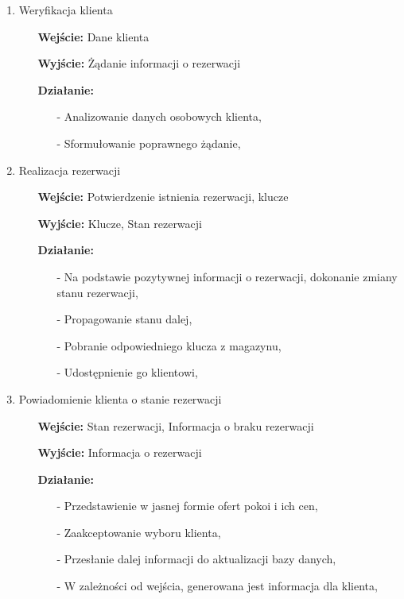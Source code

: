 \documentclass[a4paper, 11pt]{article}
\begin{document}
\begin{enumerate}[label*=\arabic*.]
\begin{enumerate}[label*=\arabic*.]
\begin{enumerate}[label*=\arabic*.]
				\item Weryfikacja klienta
				\begin{itemize}
					\item[\textbf{Wejście:}] Dane klienta
					\item[\textbf{Wyjście:}] Żądanie informacji o rezerwacji
					\item[\textbf{Działanie:}] 
					\begin{itemize}
						\item[-] Analizowanie danych osobowych klienta,
						\item[-] Sformułowanie poprawnego żądanie,
					\end{itemize}														
				\end{itemize}	
				\item Realizacja rezerwacji
				\begin{itemize}
					\item[\textbf{Wejście:}] Potwierdzenie istnienia rezerwacji, klucze
					\item[\textbf{Wyjście:}] Klucze, Stan rezerwacji
					\item[\textbf{Działanie:}] 
					\begin{itemize}
						\item[-] Na podstawie pozytywnej informacji o rezerwacji, dokonanie zmiany stanu rezerwacji,
						\item[-] Propagowanie stanu dalej,
						\item[-] Pobranie odpowiedniego klucza z magazynu,
						\item[-] Udostępnienie go klientowi,
					\end{itemize}														
				\end{itemize}	
				\item Powiadomienie klienta o stanie rezerwacji
				\begin{itemize}
					\item[\textbf{Wejście:}] Stan rezerwacji, Informacja o braku rezerwacji
					\item[\textbf{Wyjście:}] Informacja o rezerwacji
					\item[\textbf{Działanie:}] 
					\begin{itemize}
						\item[-] Przedstawienie w jasnej formie ofert pokoi i ich cen,
						\item[-] Zaakceptowanie wyboru klienta,
						\item[-] Przesłanie dalej informacji do aktualizacji bazy danych,
						\item[-] W zależności od wejścia, generowana jest informacja dla klienta,

\end{itemize}
\end{itemize}
\end{enumerate}
\end{enumerate}
\end{enumerate}
\end{document}
